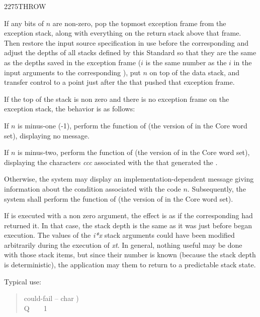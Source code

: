 \begin{newword}{2275}{THROW}

	If any bits of $n$ are non-zero, pop the topmost exception
	frame from the exception stack, along with everything on the
	return stack above that frame. Then restore the input source
	specification in use before the corresponding 
	and adjust the depths of all stacks defined by this Standard
	so that they are the same as the depths saved in the exception
	frame ($i$ is the same number as the $i$ in the input arguments
	to the corresponding ), put $n$ on top of the data
	stack, and transfer control to a point just after the
	 that pushed that exception frame.

	If the top of the stack is non zero and there is no exception
	frame on the exception stack, the behavior is as follows:

	If $n$ is minus-one (-1), perform the function of
	 (the version of  in
	the Core word set), displaying no message.

	If $n$ is minus-two, perform the function of
	 (the version of 
	in the Core word set), displaying the characters \emph{ccc}
	associated with the  that generated the
	.

	Otherwise, the system may display an implementation-dependent
	message giving information about the condition associated with
	the  code $n$. Subsequently, the system shall
	perform the function of  (the version
	of  in the Core word set).

\begin{rationale} %
	If  is executed with a non zero argument, the effect
	is as if the corresponding  had returned it. In that
	case, the stack depth is the same as it was just before 
	began execution. The values of the \emph{i*x} stack arguments could
	have been modified arbitrarily during the execution of \emph{xt}.
	In general, nothing useful may be done with those stack items, but
	since their number is known (because the stack depth is deterministic),
	the application may  them to return to a predictable
	stack state.

	Typical use:
	\begin{quote}\ttfamily
		\word{:} could-fail  -- char ) \\
		\tab {}  \word{[CHAR]} Q \word{=}~
			~ 1 
		\word{;}


\end{quote}
\end{rationale}
\end{newword}
